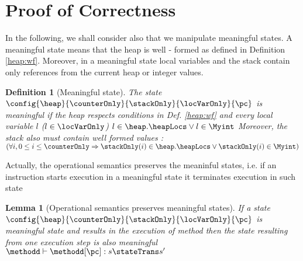 
\newtheorem{proofDef}{Definition}[section] 
\newtheorem{lemma}{Lemma}[section] %
\newtheorem*{vcGenCorrect1}{Theorem  \ref{vcGenCorrect}}
\newcommand{\state}[1]{ \tau_{#1} } 
\newcommand{\straightBraces}[1]{ \texttt{ (} #1 \texttt{ )} }
\newcommand{\tbc}{\textit{TBC}}


\section{Proof of Correctness } \label{proof}

In the following, we shall consider also that we manipulate meaningful states. A meaningful state means that the heap is 
well - formed as defined in Definition \ref{heap:wf}. Moreover, in a meaningful state local variables and the stack  contain only 
 references from the current heap or integer values.
\begin{proofDef}[Meaningful state]\label{meaningful}
The state $\config{\heap}{\counterOnly}{\stackOnly}{\locVarOnly}{\pc}  $ is meaningful if the heap respects conditions in Def. \ref{heap:wf}
and every local variable   $ l $ ($l \in \locVarOnly $)  $ l \in \heap.\heapLocs \vee l \in \Myint  $ 
Moreover, the stack also must contain well formed values : 
$ (\forall i, 0 \le i \le \counterOnly \Rightarrow \stackOnly(i) \in \heap.\heapLocs \vee \stackOnly(i)\in \Myint   )$
\end{proofDef}

Actually, the operational semantics preserves the meaninful states, i.e. if an instruction starts execution in a meaningful state 
it terminates execution in such state

\begin{lemma}[Operational semantics preserves meaningful states]\label{proof:opPresMeaningful}
If a state $\config{ \heap}{\counterOnly}{\stackOnly}{\locVarOnly}{ \pc}$ is meaningful state and results in the execution of method \methodd{}
 then the state resulting from one execution step is also meaningful $\methodd \vdash \methodd[\pc] : s \stateTrans s' $ 
\end{lemma}

 



